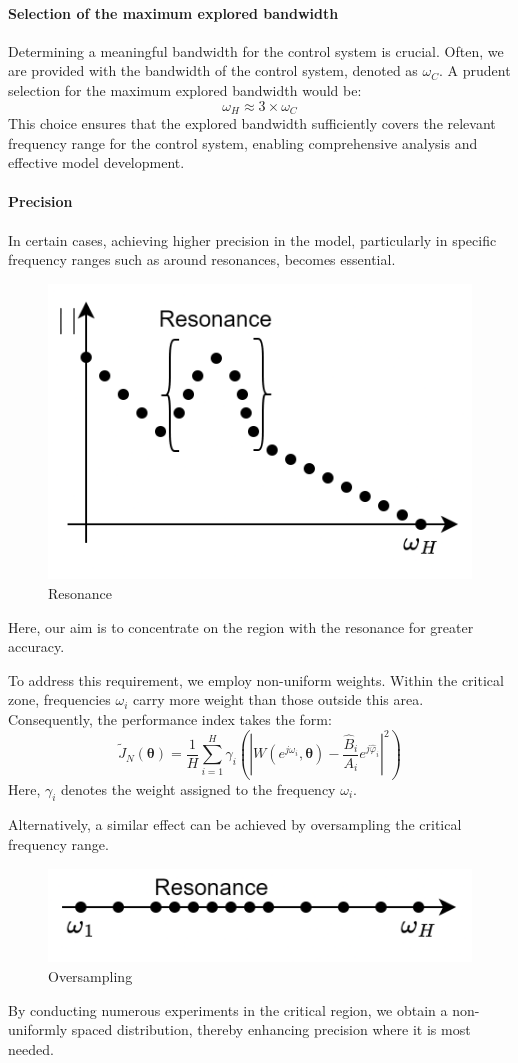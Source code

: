 \paragraph*{Selection of the maximum explored bandwidth}
Determining a meaningful bandwidth for the control system is crucial. 
Often, we are provided with the bandwidth of the control system, denoted as $\omega_C$. 
A prudent selection for the maximum explored bandwidth would be:
\[\omega_H\approx 3 \times \omega_C\]
This choice ensures that the explored bandwidth sufficiently covers the relevant frequency range for the control system, enabling comprehensive analysis and effective model development.

\paragraph*{Precision}
In certain cases, achieving higher precision in the model, particularly in specific frequency ranges such as around resonances, becomes essential. 
\begin{figure}[H]
    \centering
    \includegraphics[width=0.4\linewidth]{images/res.png}
    \caption{Resonance}
\end{figure}
Here, our aim is to concentrate on the region with the resonance for greater accuracy.

To address this requirement, we employ non-uniform weights. Within the critical zone, frequencies $\omega_i$ carry more weight than those outside this area. 
Consequently, the performance index takes the form:
\[\tilde{J}_N(\boldsymbol{\theta})=\dfrac{1}{H}\sum_{i=1}^{H}\gamma_i\left(\left\lvert W(e^{j\omega_i},\boldsymbol{\theta})-\dfrac{\hat{B}_i}{A_i}e^{j\hat{\varphi}_i} \right\rvert^2 \right)\]
Here, $\gamma_i$ denotes the weight assigned to the frequency $\omega_i$.

Alternatively, a similar effect can be achieved by oversampling the critical frequency range.
\begin{figure}[H]
    \centering
    \includegraphics[width=0.5\linewidth]{images/res1.png}
    \caption{Oversampling}
\end{figure}
By conducting numerous experiments in the critical region, we obtain a non-uniformly spaced distribution, thereby enhancing precision where it is most needed.

